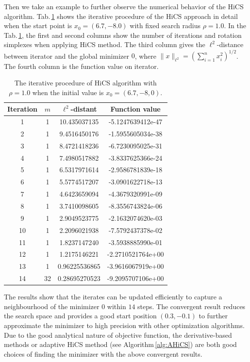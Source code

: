 \documentclass[final,1p,times]{elsarticle}
\begin{document}
Then we take an example to further observe the numerical behavior
of the HiCS algorithm.
Tab.\,\ref{tab:gauss:CHC} shows the iterative procedure of the
HiCS approach in detail when the start point is
$x_0=(6.7, -8.0)$ with fixed search radius $\rho=1.0$. 
In the Tab.\,\ref{tab:gauss:CHC}, the first and second columns show
the number of iterations and rotation simplexes when applying
HiCS
method. The third column gives the $\ell^2$-distance between
iterator and the global minimizer $0$, where
$\|x\|_{\ell^2}=\left(\sum_{i=1}^n x_i^2 \right)^{1/2}$.
The fourth column is the function value on iterator.
\begin{table}[!htbp]
\begin{center}
\caption{\label{tab:gauss:CHC}The iterative procedure of 
HiCS algorithm with $\rho=1.0$ when the initial value
is $x_0=(6.7, -8,0)$.}	
\begin{tabular}{|c|c|c|c|}
 \hline
Iteration & $m$ & $\ell^2$-distant &  Function value
 \\\hline
 1 & 1 & 10.435037135 & -5.1247639412e-47 \\
 \hline
 2 & 1 &  9.4516450176 & -1.5955605034e-38 \\
 \hline
 3 & 1 &  8.4721418236 & -6.7230095025e-31 \\
 \hline
 4 & 1 & 7.4980517882 & -3.8337625366e-24 \\
 \hline
 5 & 1 &  6.5317971614 & -2.9586781839e-18 \\
 \hline
 6 & 1 &  5.5774517207 & -3.0901622718e-13 \\
 \hline
 7 & 1 &  4.6423659094 & -4.3679320991e-09 \\
 \hline
 8 & 1 &  3.7410098605 & -8.3556743824e-06 \\
 \hline
 9 & 1 &  2.9049523775 & -2.1632074620e-03 \\
 \hline
 10 & 1 &  2.2096021938 & -7.5792437378e-02 \\
 \hline
 11 & 1 &  1.8237147240 & -3.5938885990e-01 \\
 \hline
 12 & 1 &  1.2175146221 & -2.2710521764e+00 \\
 \hline
 13 & 1 &  0.96225536865 & -3.9616067919e+00 \\
 \hline
 14 & 32 & 0.28695270523 & -9.2095707106e+00 \\
 \hline
\end{tabular}
\end{center}
\end{table}
The results show that the iterates can be updated efficiently to
capture a neighbourhood of the minimizer $0$ within $14$ steps. 
The convergent result reduces the search space and
provides a good start position $(0.3, -0.1)$ to further
approximate the minimizer to high precision with other
optimization algorithms.
Due to the good analytical nature of objective function, the
derivative-based methods or adaptive HiCS method (see
Algorithm\,\ref{alg:AHiCS}) are both good choices of finding the
minimizer with the above convergent results. 
\end{document}

